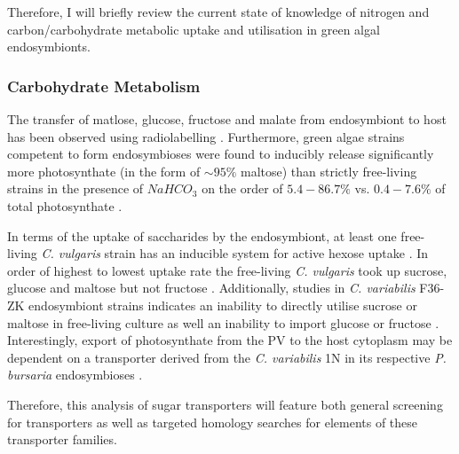 Therefore, I will briefly review the current state of knowledge of
nitrogen and carbon/carbohydrate metabolic uptake and utilisation in green algal 
endosymbionts.

\subsubsection{Carbohydrate Metabolism}


The transfer of matlose, glucose, fructose and malate from endosymbiont
to host has been observed using radiolabelling 
\citep{Brown1974}.  Furthermore, green algae strains competent to
form endosymbioses were found to inducibly release significantly
more photosynthate (in the form of \(\sim 95\%\) maltose) than strictly free-living strains
in the presence of \(NaHCO_3\) on the order of \(5.4-86.7\%\) vs. \(0.4-7.6\%\)
of total photosynthate \citep{Muscatine1967a}.

In terms of the uptake of saccharides by the endosymbiont, 
at least one free-living \textit{C. vulgaris} 
strain has an inducible system for active hexose uptake \citep{Tanner1974}.
In order of highest to lowest uptake rate the free-living \textit{C. vulgaris} 
took up sucrose, glucose and maltose but not fructose \citep{Kato2009a}.
Additionally, studies in \textit{C. variabilis} F36-ZK endosymbiont strains
indicates an inability to directly utilise sucrose or maltose in free-living culture \citep{Kamako2005}
as well an inability to import glucose or fructose \citep{Kato2008a}.
Interestingly, export of photosynthate from the PV to the host cytoplasm may be dependent on a transporter
derived from the \textit{C. variabilis} 1N in its respective \textit{P. bursaria} endosymbioses \citep{Kodama2008}.

Therefore, this analysis of sugar transporters will feature both general screening
for transporters as well as targeted homology searches for elements of these
transporter families.

